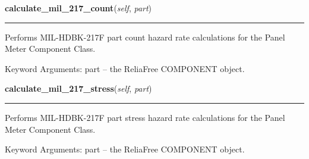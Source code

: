     \label{reliafree:meters:meter:Panel:calculate_mil_217_count}

    \vspace{0.5ex}

\hspace{.8\funcindent}\begin{boxedminipage}{\funcwidth}

    \raggedright \textbf{calculate\_mil\_217\_count}(\textit{self}, \textit{part})

    \vspace{-1.5ex}

    \rule{\textwidth}{0.5\fboxrule}
\setlength{\parskip}{2ex}
    Performs MIL-HDBK-217F part count hazard rate calculations for the 
    Panel Meter Component Class.

    Keyword Arguments: part -- the ReliaFree COMPONENT object.

\setlength{\parskip}{1ex}
    \end{boxedminipage}

    \label{reliafree:meters:meter:Panel:calculate_mil_217_stress}

    \vspace{0.5ex}

\hspace{.8\funcindent}\begin{boxedminipage}{\funcwidth}

    \raggedright \textbf{calculate\_mil\_217\_stress}(\textit{self}, \textit{part})

    \vspace{-1.5ex}

    \rule{\textwidth}{0.5\fboxrule}
\setlength{\parskip}{2ex}
    Performs MIL-HDBK-217F part stress hazard rate calculations for the 
    Panel Meter Component Class.

    Keyword Arguments: part -- the ReliaFree COMPONENT object.

\setlength{\parskip}{1ex}
    \end{boxedminipage}

